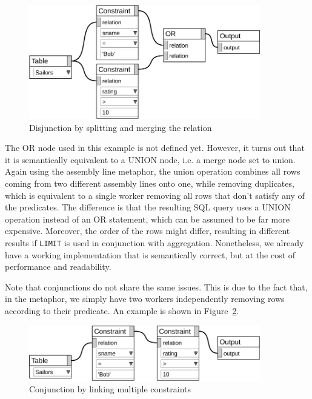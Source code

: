\documentclass[11pt,a4paper]{globis-book}
\begin{document}
\begin{figure}[h]
  \centering
  \includegraphics[width=0.9\textwidth]{resources/Disjunction.pdf}
  \caption{Disjunction by splitting and merging the relation}
  \label{fig:disjunction}
\end{figure}

The OR node used in this example is not defined yet. However, it turns out that it is semantically equivalent to a UNION node, i.e. a merge node set to union. Again using the assembly line metaphor, the union operation combines all rows coming from two different assembly lines onto one, while removing duplicates, which is equivalent to a single worker removing all rows that don't satisfy any of the predicates. The difference is that the resulting SQL query uses a UNION operation instead of an OR statement, which can be assumed to be far more expensive. Moreover, the order of the rows might differ, resulting in different results if \texttt{LIMIT} is used in conjunction with aggregation. Nonetheless, we already have a working implementation that is semantically correct, but at the cost of performance and readability.

Note that conjunctions do not share the same issues. This is due to the fact that, in the metaphor, we simply have two workers independently removing rows according to their predicate. An example is shown in Figure~\ref{fig:conjunction}.

\begin{figure}[h]
  \centering
  \includegraphics[width=0.9\textwidth]{resources/Conjunction.pdf}
  \caption{Conjunction by linking multiple constraints}
  \label{fig:conjunction}
\end{figure}
\end{document}
